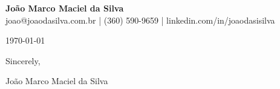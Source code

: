 \documentclass[11pt,letterpaper]{article}
\newcommand{\MYNAME}{João Marco Maciel da Silva}
\begin{document}
\begin{center}
\textbf{\Large{\MYNAME}}\\
joao@joaodasilva.com.br | (360) 590-9659 | linkedin.com/in/joaodasisilva
\end{center}

\noindent\today

\vspace{0.3cm}



\vspace{0.3cm}

\noindent Sincerely,

\vspace{0.4cm}

\noindent \MYNAME
\end{document}
